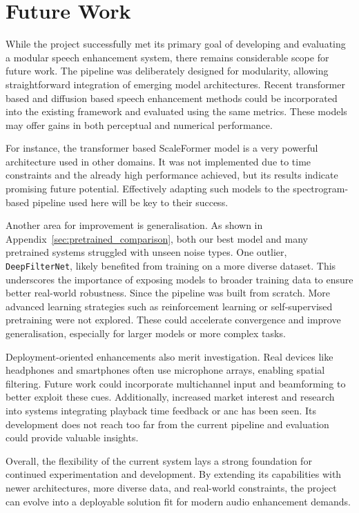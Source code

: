 \chapter{Future Work}
\label{chp:future_work}

While the project successfully met its primary goal of developing and evaluating a modular speech enhancement system, there remains considerable scope for future work. The pipeline was deliberately designed for modularity, allowing straightforward integration of emerging model architectures. Recent transformer based and diffusion based speech enhancement methods could be incorporated into the existing framework and evaluated using the same metrics. These models may offer gains in both perceptual and numerical performance.

For instance, the transformer based ScaleFormer model \cite{wu2023scaleformer}
is a very powerful architecture used in other domains. It was not implemented due to time constraints and the already high performance achieved, but its results indicate promising future potential. Effectively adapting such models to the spectrogram-based pipeline used here will be key to their success.

Another area for improvement is generalisation. As shown in Appendix~\ref{sec:pretrained_comparison}, both our best model and many pretrained systems struggled with unseen noise types. One outlier, \texttt{DeepFilterNet}, likely benefited from training on a more diverse dataset. This underscores the importance of exposing models to broader training data to ensure better real-world robustness. Since the pipeline was built from scratch. More advanced learning strategies such as reinforcement learning or self-supervised pretraining were not explored. These could accelerate convergence and improve generalisation, especially for larger models or more complex tasks.

Deployment-oriented enhancements also merit investigation. Real devices like headphones and smartphones often use microphone arrays, enabling spatial filtering. Future work could incorporate multichannel input and beamforming to better exploit these cues. Additionally, increased market interest and research into systems integrating playback time feedback or \gls{anc} has been seen. Its development does not reach too far from the current pipeline and evaluation could provide valuable insights.

Overall, the flexibility of the current system lays a strong foundation for continued experimentation and development. By extending its capabilities with newer architectures, more diverse data, and real-world constraints, the project can evolve into a deployable solution fit for modern audio enhancement demands.



